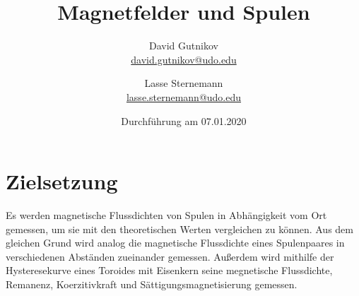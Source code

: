 \documentclass[titlepage = firstcover]{scrartcl}
\title{Magnetfelder und Spulen}
\author{
  David Gutnikov\\
  \href{mailto:david.gutnikov@udo.edu}{david.gutnikov@udo.edu}
 \and 
  Lasse Sternemann\\
  \href{mailto:lasse.sternemann@udo.edu}{lasse.sternemann@udo.edu}
}
\date{Durchführung am 07.01.2020}
\begin{document}
    \maketitle
    \newpage
    \tableofcontents
    \newpage

    \section{Zielsetzung}
      Es werden magnetische Flussdichten von Spulen in Abhängigkeit vom Ort gemessen, um sie mit den theoretischen Werten vergleichen zu können. Aus dem
      gleichen Grund wird analog die magnetische Flussdichte eines Spulenpaares in verschiedenen Abständen zueinander gemessen. Außerdem wird mithilfe der
      Hysteresekurve eines Toroides mit Eisenkern seine megnetische Flussdichte, Remanenz, Koerzitivkraft und Sättigungsmagnetisierung gemessen.
\end{document}
